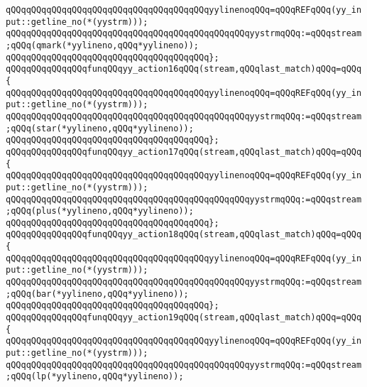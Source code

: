 \verb|qQQqqQQqqQQqqQQqqQQqqQQqqQQqqQQqqQQqqQQqyylinenoqQQq=qQQqREFqQQq(yy_input::getline_no(*(yystrm)));|\newline
\newline
\verb|qQQqqQQqqQQqqQQqqQQqqQQqqQQqqQQqqQQqqQQqqQQqqQQqyystrmqQQq:=qQQqstream;qQQq(qmark(*yylineno,qQQq*yylineno));|\newline
\verb|qQQqqQQqqQQqqQQqqQQqqQQqqQQqqQQqqQQqqQQq};|\newline
\verb|qQQqqQQqqQQqqQQqfunqQQqyy_action16qQQq(stream,qQQqlast_match)qQQq=qQQq{|\newline
\verb|qQQqqQQqqQQqqQQqqQQqqQQqqQQqqQQqqQQqqQQqyylinenoqQQq=qQQqREFqQQq(yy_input::getline_no(*(yystrm)));|\newline
\newline
\verb|qQQqqQQqqQQqqQQqqQQqqQQqqQQqqQQqqQQqqQQqqQQqqQQqyystrmqQQq:=qQQqstream;qQQq(star(*yylineno,qQQq*yylineno));|\newline
\verb|qQQqqQQqqQQqqQQqqQQqqQQqqQQqqQQqqQQqqQQq};|\newline
\verb|qQQqqQQqqQQqqQQqfunqQQqyy_action17qQQq(stream,qQQqlast_match)qQQq=qQQq{|\newline
\verb|qQQqqQQqqQQqqQQqqQQqqQQqqQQqqQQqqQQqqQQqyylinenoqQQq=qQQqREFqQQq(yy_input::getline_no(*(yystrm)));|\newline
\newline
\verb|qQQqqQQqqQQqqQQqqQQqqQQqqQQqqQQqqQQqqQQqqQQqqQQqyystrmqQQq:=qQQqstream;qQQq(plus(*yylineno,qQQq*yylineno));|\newline
\verb|qQQqqQQqqQQqqQQqqQQqqQQqqQQqqQQqqQQqqQQq};|\newline
\verb|qQQqqQQqqQQqqQQqfunqQQqyy_action18qQQq(stream,qQQqlast_match)qQQq=qQQq{|\newline
\verb|qQQqqQQqqQQqqQQqqQQqqQQqqQQqqQQqqQQqqQQqyylinenoqQQq=qQQqREFqQQq(yy_input::getline_no(*(yystrm)));|\newline
\newline
\verb|qQQqqQQqqQQqqQQqqQQqqQQqqQQqqQQqqQQqqQQqqQQqqQQqyystrmqQQq:=qQQqstream;qQQq(bar(*yylineno,qQQq*yylineno));|\newline
\verb|qQQqqQQqqQQqqQQqqQQqqQQqqQQqqQQqqQQqqQQq};|\newline
\verb|qQQqqQQqqQQqqQQqfunqQQqyy_action19qQQq(stream,qQQqlast_match)qQQq=qQQq{|\newline
\verb|qQQqqQQqqQQqqQQqqQQqqQQqqQQqqQQqqQQqqQQqyylinenoqQQq=qQQqREFqQQq(yy_input::getline_no(*(yystrm)));|\newline
\newline
\verb|qQQqqQQqqQQqqQQqqQQqqQQqqQQqqQQqqQQqqQQqqQQqqQQqyystrmqQQq:=qQQqstream;qQQq(lp(*yylineno,qQQq*yylineno));|\newline
